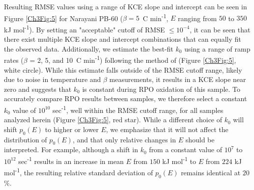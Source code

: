 Resulting RMSE values using a range of KCE slope and intercept can be seen in Figure \ref{Ch3Fig:5} for Narayani PB-60 ($\beta = 5$\textdegree\ C min\textsuperscript{-1}, $E$ ranging from $50$ to $350$ kJ mol\textsuperscript{-1}). By setting an "acceptable" cutoff of RMSE $\leq 10^{-4}$, it can be seen that there exist multiple KCE slope and intercept combinations that can equally fit the observed data. Additionally, we estimate the best-fit $k_{0}$ using a range of ramp rates ($\beta$ = 2, 5, and 10\textdegree\ C min\textsuperscript{-1}) following the method of \citet{Miura:1998jf} (Figure \ref{Ch3Fig:5}, white circle). While this estimate falls outside of the RMSE cutoff range, likely due to noise in temperature and $\beta$ measurements, it results in a KCE slope near zero and suggests that $k_{0}$ is constant during RPO oxidation of this sample. To accurately compare RPO results between samples, we therefore select a constant $k_{0}$ value of $10^{10}$ sec\textsuperscript{-1}, well within the RMSE cutoff range, for all samples analyzed herein (Figure \ref{Ch3Fig:5}, red star). While a different choice of $k_{0}$ will shift $p_{0}(E)$ to higher or lower $E$, we emphasize that it will not affect the distribution of $p_{0}(E)$, and that only relative changes in $E$ should be interpreted. For example, although a shift in $k_{0}$ from a constant value of $10^{7}$ to $10^{12}$ sec\textsuperscript{-1} results in an increase in mean $E$ from $150$ kJ mol\textsuperscript{-1} to $E$ from $224$ kJ mol\textsuperscript{-1}, the resulting relative standard deviation of $p_{0}(E)$ remains identical at $20$\%.
 
